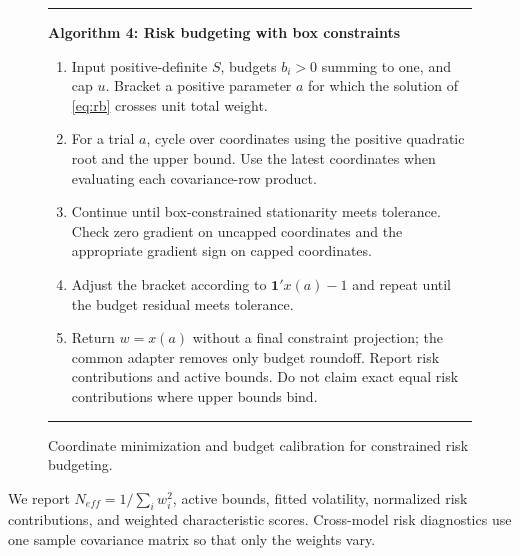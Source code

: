 \documentclass[letterpaper,journal]{IEEEtran}
\begin{document}
\begin{figure}[t]\centering
\begin{minipage}{0.96\textwidth}\hrule\smallskip
\textbf{Algorithm 4: Risk budgeting with box constraints}\smallskip
\begin{enumerate}\setlength{\itemsep}{1pt}
\item Input positive-definite $S$, budgets $b_i>0$ summing to one, and cap $u$. Bracket a positive parameter $a$ for which the solution of \eqref{eq:rb} crosses unit total weight.
\item For a trial $a$, cycle over coordinates using the positive quadratic root and the upper bound. Use the latest coordinates when evaluating each covariance-row product.
\item Continue until box-constrained stationarity meets tolerance. Check zero gradient on uncapped coordinates and the appropriate gradient sign on capped coordinates.
\item Adjust the bracket according to $\mathbf1'x(a)-1$ and repeat until the budget residual meets tolerance.
\item Return $w=x(a)$ without a final constraint projection; the common adapter removes only budget roundoff. Report risk contributions and active bounds. Do not claim exact equal risk contributions where upper bounds bind.
\end{enumerate}\hrule
\end{minipage}
\caption{Coordinate minimization and budget calibration for constrained risk budgeting.}\label{alg:rb}
\end{figure}

We report $N_{eff}=1/\sum_iw_i^2$, active bounds, fitted volatility, normalized risk contributions, and weighted characteristic scores. Cross-model risk diagnostics use one sample covariance matrix so that only the weights vary.
\end{document}
